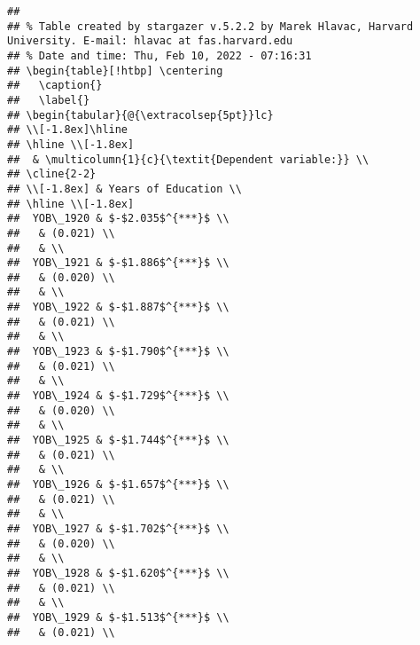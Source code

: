 \documentclass[
  12pt,
  landscape]{article}
\begin{document}
\begin{verbatim}
## 
## % Table created by stargazer v.5.2.2 by Marek Hlavac, Harvard University. E-mail: hlavac at fas.harvard.edu
## % Date and time: Thu, Feb 10, 2022 - 07:16:31
## \begin{table}[!htbp] \centering 
##   \caption{} 
##   \label{} 
## \begin{tabular}{@{\extracolsep{5pt}}lc} 
## \\[-1.8ex]\hline 
## \hline \\[-1.8ex] 
##  & \multicolumn{1}{c}{\textit{Dependent variable:}} \\ 
## \cline{2-2} 
## \\[-1.8ex] & Years of Education \\ 
## \hline \\[-1.8ex] 
##  YOB\_1920 & $-$2.035$^{***}$ \\ 
##   & (0.021) \\ 
##   & \\ 
##  YOB\_1921 & $-$1.886$^{***}$ \\ 
##   & (0.020) \\ 
##   & \\ 
##  YOB\_1922 & $-$1.887$^{***}$ \\ 
##   & (0.021) \\ 
##   & \\ 
##  YOB\_1923 & $-$1.790$^{***}$ \\ 
##   & (0.021) \\ 
##   & \\ 
##  YOB\_1924 & $-$1.729$^{***}$ \\ 
##   & (0.020) \\ 
##   & \\ 
##  YOB\_1925 & $-$1.744$^{***}$ \\ 
##   & (0.021) \\ 
##   & \\ 
##  YOB\_1926 & $-$1.657$^{***}$ \\ 
##   & (0.021) \\ 
##   & \\ 
##  YOB\_1927 & $-$1.702$^{***}$ \\ 
##   & (0.020) \\ 
##   & \\ 
##  YOB\_1928 & $-$1.620$^{***}$ \\ 
##   & (0.021) \\ 
##   & \\ 
##  YOB\_1929 & $-$1.513$^{***}$ \\ 
##   & (0.021) \\ 

\end{verbatim}
\end{document}
